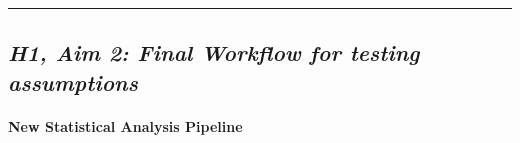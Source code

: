 \documentclass[11pt]{article}
\begin{document}
    \begin{center}\rule{0.5\linewidth}{\linethickness}\end{center}

\hypertarget{h1-aim-2-final-workflow-for-testing-assumptions}{%
\subsection{\texorpdfstring{\textbf{\emph{H1, Aim 2: Final Workflow for
testing
assumptions}}}{H1, Aim 2: Final Workflow for testing assumptions}}\label{h1-aim-2-final-workflow-for-testing-assumptions}}

    \hypertarget{new-statistical-analysis-pipeline}{%
\paragraph{New Statistical Analysis
Pipeline}\label{new-statistical-analysis-pipeline}}
\end{document}
